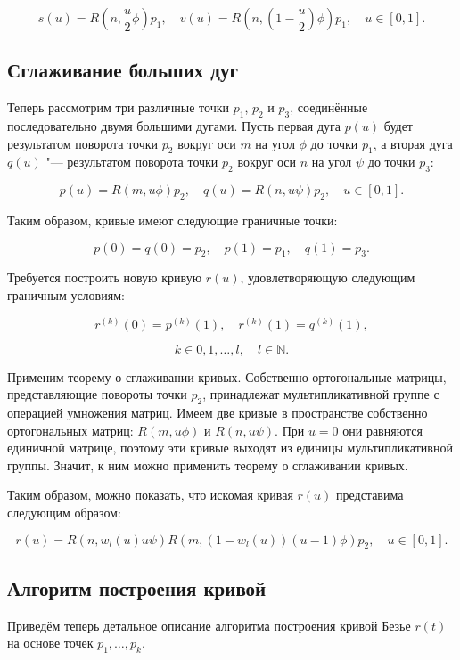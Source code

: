 \begin{equation}
s(u)=R(n,\frac{u}{2}\phi)p_1, \quad v(u)=R(n,(1-\frac{u}{2})\phi)p_1, \quad u \in [0,1].
\label{two-dimension-big-arc-halfs}
\end{equation}

\subsection*{Сглаживание больших дуг}

Теперь рассмотрим три различные точки $p_1$, $p_2$ и $p_3$, соединённые последовательно двумя большими
дугами. Пусть первая дуга $p(u)$ будет результатом поворота точки $p_2$ вокруг оси $m$ на угол $\phi$ до точки $p_1$,
а вторая дуга $q(u)$ "--- результатом поворота точки $p_2$ вокруг оси $n$ на угол $\psi$ до точки $p_3$:

$$
p(u)=R(m,u\phi)p_2, \quad q(u)=R(n,u\psi)p_2, \quad u \in [0,1].
$$

Таким образом, кривые имеют следующие граничные точки:

$$
p(0)=q(0)=p_2, \quad p(1)=p_1, \quad q(1)=p_3.
$$

Требуется построить новую кривую $r(u)$, удовлетворяющую следующим граничным условиям:

$$
r^{(k)}(0)=p^{(k)}(1), \quad r^{(k)}(1)=q^{(k)}(1),
$$

$$
k \in {0,1,\dots,l}, \quad l \in \mathbb{N}.
$$

Применим теорему о сглаживании кривых. Собственно ортогональные матрицы, представляющие повороты
точки $p_2$, принадлежат мультипликативной группе с операцией умножения матриц. Имеем две кривые в пространстве
собственно ортогональных матриц: $R(m,u\phi)$ и $R(n,u\psi)$. При $u=0$ они равняются единичной матрице, поэтому эти
кривые выходят из единицы мультипликативной группы. Значит, к ним можно применить теорему о сглаживании кривых.

Таким образом, можно показать, что искомая кривая $r(u)$ представима следующим образом:

$$
r(u)=R(n,w_l(u)u\psi)R(m,(1-w_l(u))(u-1)\phi)p_2, \quad u \in [0,1].
$$

\subsection*{Алгоритм построения кривой}

Приведём теперь детальное описание алгоритма построения кривой Безье $r(t)$ на основе точек $p_1,\dots,p_k$.

